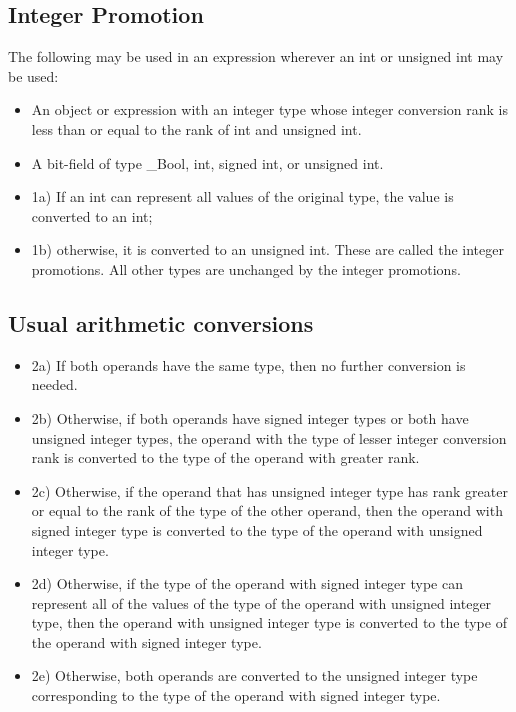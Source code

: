 \documentclass{article}
\begin{document}
\subsection{Integer Promotion}
    The following may be used in an expression wherever an int or unsigned int may
    be used:
    \begin{itemize}[noitemsep]
        \item An object or expression with an integer type whose integer conversion rank is less
        than or equal to the rank of int and unsigned int.
        \item A bit-field of type \_Bool, int, signed int, or unsigned int.
    \end{itemize}
\begin{itemize}[noitemsep]
    \item 1a) If an int can represent all values of the original type, the value is converted to an int;
    \item 1b) otherwise, it is converted to an unsigned int.
    These are called the integer promotions. All other types are unchanged by the integer promotions.
\end{itemize}

\subsection{Usual arithmetic conversions}
\begin{itemize}[noitemsep]
    \item 2a) If both operands have the same type, then no further conversion is needed.

    \item 2b) Otherwise, if both operands have signed integer types or both have unsigned
    integer types, the operand with the type of lesser integer conversion rank is
    converted to the type of the operand with greater rank.

    \item 2c) Otherwise, if the operand that has unsigned integer type has rank greater or
    equal to the rank of the type of the other operand, then the operand with
    signed integer type is converted to the type of the operand with unsigned
    integer type.

    \item 2d) Otherwise, if the type of the operand with signed integer type can represent
    all of the values of the type of the operand with unsigned integer type, then
    the operand with unsigned integer type is converted to the type of the
    operand with signed integer type.

    \item 2e) Otherwise, both operands are converted to the unsigned integer type
    corresponding to the type of the operand with signed integer type.
\end{itemize}
\end{document}
